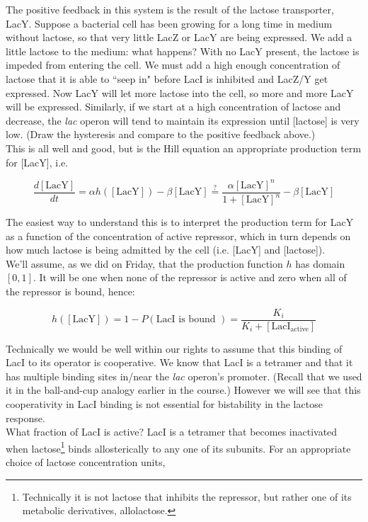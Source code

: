 \documentclass{article}
\begin{document}
The positive feedback in this system is the result of the lactose transporter, LacY. Suppose a bacterial cell has been growing for a long time in medium without lactose, so that very little LacZ or LacY are being expressed. We add a little lactose to the medium: what happens? With no LacY present, the lactose is impeded from entering the cell. We must add a high enough concentration of lactose that it is able to ``seep in" before LacI is inhibited and LacZ/Y get expressed. Now LacY will let more lactose into the cell, so more and more LacY will be expressed. Similarly, if we start at a high concentration of lactose and decrease, the \textit{lac} operon will tend to maintain its expression until [lactose] is very low. (Draw the hysteresis and compare to the positive feedback above.)\\

This is all well and good, but is the Hill equation an appropriate production term for [LacY], i.e.

\[ \frac{d\left[ \textrm{LacY}\right]}{dt} = \alpha h \left( \left[ \textrm{LacY} \right] \right) - \beta \left[ \textrm{LacY} \right]  \stackrel{?}{=} \frac{\alpha \left[ \textrm{LacY}\right]^n}{1 + \left[ \textrm{LacY}\right]^n} - \beta \left[ \textrm{LacY}\right]\]

The easiest way to understand this is to interpret the production term for LacY as a function of the concentration of active repressor, which in turn depends on how much lactose is being admitted by the cell (i.e. [LacY] and [lactose]).\\

We'll assume, as we did on Friday, that the production function $h$ has domain $[0,1]$. It will be one when none of the repressor is active and zero when all of the repressor is bound, hence:

\[ h \left( \left[ \textrm{LacY} \right] \right) = 1 - P\left( \textrm{LacI is bound }\right) =  \frac{K_i}{K_i + \left[\textrm{LacI}_{\textrm{active}} \right]} \]

Technically we would be well within our rights to assume that this binding of LacI to its operator is cooperative. We know that LacI is a tetramer and that it has multiple binding sites in/near the \textit{lac} operon's promoter. (Recall that we used it in the ball-and-cup analogy earlier in the course.) However we will see that this cooperativity in LacI binding is not essential for bistability in the lactose response. \\

What fraction of LacI is active? LacI is a tetramer that becomes inactivated when lactose\footnote{Technically it is not lactose that inhibits the repressor, but rather one of its metabolic derivatives, allolactose.} binds allosterically to any one of its subunits. For an appropriate choice of lactose concentration units,
\end{document}
